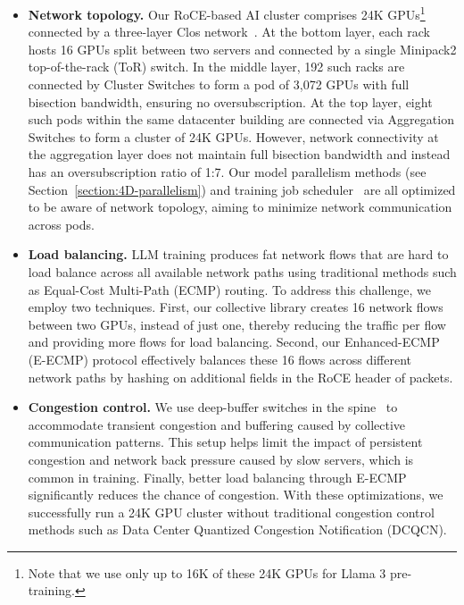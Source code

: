 \begin{itemize}

    \item \textbf{Network topology.} Our RoCE-based AI cluster comprises 24K GPUs\footnote{Note that we use only up to 16K of these 24K GPUs for Llama 3 pre-training.} connected by a three-layer Clos network~\citep{lee2024building}. At the bottom layer, each rack hosts 16 GPUs split between two servers and connected by a single Minipack2 top-of-the-rack (ToR) switch. In the middle layer, 192 such racks are connected by Cluster Switches to form a pod of 3,072 GPUs with full bisection bandwidth, ensuring no oversubscription. At the top layer, eight such pods within the same datacenter building are connected via Aggregation Switches to form a cluster of 24K GPUs. However, network connectivity at the aggregation layer does not maintain full bisection bandwidth and instead has an oversubscription ratio of 1:7. Our model parallelism methods (see Section~\ref{section:4D-parallelism}) and training job scheduler~\citep{choudhury2024mast} are all optimized to be aware of network topology, aiming to minimize network communication across pods.

    \item \textbf{Load balancing.} LLM training produces fat network flows that are hard to load balance across all available network paths using traditional methods such as Equal-Cost Multi-Path (ECMP) routing. To address this challenge, we employ two techniques. First, our collective library creates 16 network flows between two GPUs, instead of just one, thereby reducing the traffic per flow and providing more flows for load balancing. Second, our Enhanced-ECMP (E-ECMP) protocol effectively balances these 16 flows across different network paths by hashing on additional fields in the RoCE header of packets.

    \item \textbf{Congestion control.} We use deep-buffer switches in the spine~\citep{gangidi2024rmda} to accommodate transient congestion and buffering caused by collective communication patterns. This setup helps limit the impact of persistent congestion and network back pressure caused by slow servers, which is common in  training. Finally, better load balancing through E-ECMP significantly reduces the chance of congestion. With these optimizations, we successfully run a 24K GPU cluster without traditional congestion control methods such as Data Center Quantized Congestion Notification (DCQCN). 
\end{itemize}

